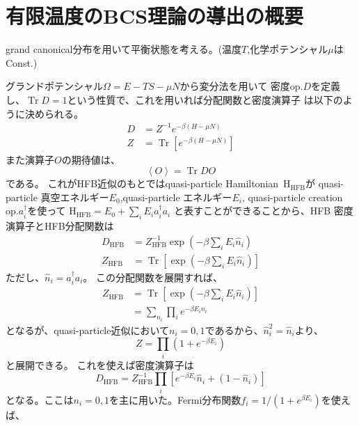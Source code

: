 \documentclass[a4paper,10pt]{jsarticle}
\begin{document}
  \section{有限温度のBCS理論の導出の概要}
  grand canonical分布を用いて平衡状態を考える。(温度$T$,化学ポテンシャル$\mu$はConst.)
  
  グランドポテンシャル$\Omega=E- TS -\mu N$から変分法を用いて
  密度op.$D$を定義し、$\operatorname{Tr}D=1$という性質で、これを用いれば分配関数と密度演算子
  は以下のように決められる。
  \begin{align}
    D &= Z^{-1}e^{-\beta(H-\mu N)}\\
    Z &= \operatorname{Tr}\left[e^{-\beta(H-\mu N)}\right]
  \end{align}
  また演算子$O$の期待値は、
  \begin{equation}
    \left\langle O\right\rangle=\operatorname{Tr}DO\label{期待値}
  \end{equation}
  である。
  これがHFB近似のもとではquasi-particle Hamiltonian\ $\operatorname{H_{\text{HFB}}}$が
  quasi-particle 真空エネルギー$E_0$,quasi-particle エネルギー$E_i$,
  quasi-particle creation op.$a_i^{\dagger}$を使って
  $\operatorname{H_{\text{HFB}}}=E_0 + \sum_{i}E_i a_i^{\dagger}a_i$
  と表すことができることから、HFB 密度演算子とHFB分配関数は
  \begin{align}
    D_{\text{HFB}} &= Z_{\text{HFB}}^{-1}\exp\left(-\beta \sum_i E_i \hat{n}_i\right)\\
    Z_{\text{HFB}} &= \operatorname{Tr}\left[\exp\left(-\beta \sum_i E_i \hat{n}_i\right)\right]
  \end{align}
  ただし、$\hat{n}_i = a_i^{\dagger}a_i$。
  この分配関数を展開すれば、
  \begin{align}
    Z_{\text{HFB}} &= \operatorname{Tr}\left[\exp\left(-\beta \sum_i E_i \hat{n}_i\right)\right]\\
    &= \sum_{n_i}\prod _{i} e^{-\beta E_i n_i}
  \end{align}
  となるが、quasi-particle近似において$n_i=0,1$であるから、$\hat{n}_i^2=\hat{n}_i$より、
  \begin{equation}
    Z=\prod _{i} \left(1 + e^{-\beta E_i}\right)
  \end{equation}
  と展開できる。
  これを使えば密度演算子は
  \begin{equation}
    D_{\text{HFB}} = Z_{\text{HFB}}^{-1}\prod _{i}
    \left[e^{-\beta E_i}\hat{n}_i + (1 - \hat{n}_i)\right]
  \end{equation}
  となる。ここは$n_i=0,1$を主に用いた。Fermi分布関数$f_i=1/(1 + e^{\beta E_i})$を使えば、
\end{document}
